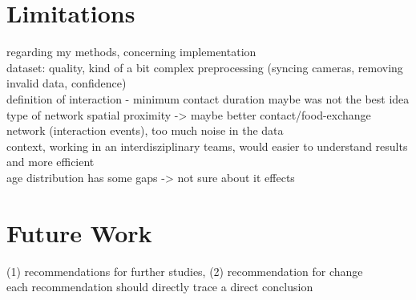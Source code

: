 \section{Limitations}
regarding my methods, concerning implementation\\
dataset: quality, kind of a bit complex preprocessing (syncing cameras, removing invalid data, confidence)\\
definition of interaction - minimum contact duration maybe was not the best idea\\
type of network spatial proximity -> maybe better contact/food-exchange network (interaction events), too much noise in the data\\
context, working in an interdisziplinary teams, would easier to understand results and more efficient\\
age distribution has some gaps -> not sure about it effects\\

\section{Future Work}
(1) recommendations for further studies, (2) recommendation for change\\
each recommendation should directly trace a direct conclusion\\

